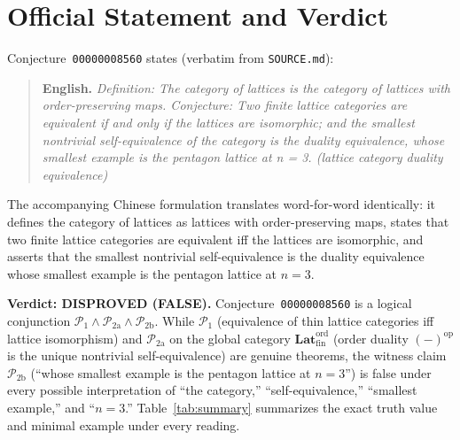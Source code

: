 \documentclass[11pt]{article}
\theoremstyle{definition}
\newcommand{\FinLatOrd}{\mathbf{Lat}_{\mathrm{fin}}^{\mathrm{ord}}}
\newcommand{\op}{\mathrm{op}}
\begin{document}
\section{Official Statement and Verdict}

Conjecture~\texttt{00000008560} states (verbatim from \texttt{SOURCE.md}):

\begin{quote}
\textbf{English.} \emph{Definition: The category of lattices is the category of
lattices with order-preserving maps. Conjecture: Two finite lattice categories
are equivalent if and only if the lattices are isomorphic; and the smallest
nontrivial self-equivalence of the category is the duality equivalence, whose
smallest example is the pentagon lattice at n = 3. (lattice category duality
equivalence)}
\end{quote}

The accompanying Chinese formulation translates word-for-word identically: it
defines the category of lattices as lattices with order-preserving maps, states
that two finite lattice categories are equivalent iff the lattices are
isomorphic, and asserts that the smallest nontrivial self-equivalence is the
duality equivalence whose smallest example is the pentagon lattice at $n = 3$.

\medskip
\noindent\textbf{Verdict: DISPROVED (FALSE).}
Conjecture~\texttt{00000008560} is a logical conjunction
$\mathcal{P}_1 \wedge \mathcal{P}_{2\mathrm{a}} \wedge \mathcal{P}_{2\mathrm{b}}$.
While $\mathcal{P}_1$ (equivalence of thin lattice categories iff lattice
isomorphism) and $\mathcal{P}_{2\mathrm{a}}$ on the global category $\FinLatOrd$
(order duality $(-)^{\op}$ is the unique nontrivial self-equivalence) are
genuine theorems, the witness claim $\mathcal{P}_{2\mathrm{b}}$ (``whose
smallest example is the pentagon lattice at $n = 3$'') is false under every
possible interpretation of ``the category,'' ``self-equivalence,'' ``smallest
example,'' and ``$n = 3$.'' Table~\ref{tab:summary} summarizes the exact truth
value and minimal example under every reading.
\end{document}

